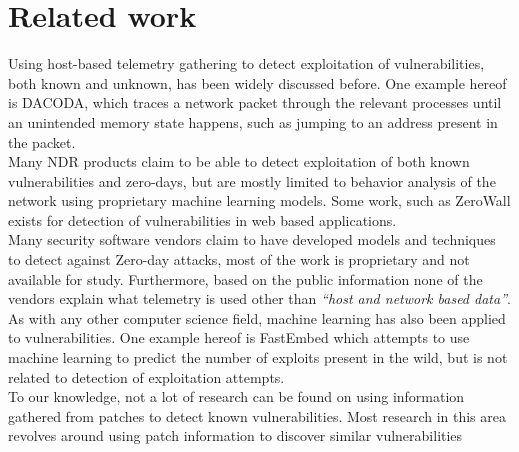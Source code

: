 \documentclass{report}
\begin{document}
\section{Related work}
Using host-based telemetry gathering to detect exploitation of vulnerabilities, both known and unknown, has been widely discussed before\cite{paper:related-work:taint-check}\cite{paper:related-work:dacoda}. One example hereof is DACODA\cite{paper:related-work:dacoda}, which traces a network packet through the relevant processes until an unintended memory state happens, such as jumping to an address present in the packet.
\\
Many \gls{NDR} products claim to be able to detect exploitation of both known vulnerabilities and zero-days\cite{url:0-day-detection:darktrace}\cite{url:0-day-detection:wehowsky}, but are mostly limited to behavior analysis of the network using proprietary machine learning models. Some work, such as ZeroWall\cite{tang2020zerowall} exists for detection of vulnerabilities in web based applications.
\\
Many security software vendors claim to have developed models and techniques to detect against Zero-day attacks\cite{url:0-day-detection:checkpoint}\cite{url:0-day-detection:capsule8}\cite{url:0-day-detection:logsign}, most of the work is proprietary and not available for study. Furthermore, based on the public information none of the vendors explain what telemetry is used other than \emph{``host and network based data''}.
\\
As with any other computer science field, machine learning has also been applied to vulnerabilities. One example hereof is FastEmbed\cite{10.1371/journal.pone.0228439} which attempts to use machine learning to predict the number of exploits present in the wild, but is not related to detection of exploitation attempts.
\\
To our knowledge, not a lot of research can be found on using information gathered from patches to detect known vulnerabilities. Most research in this area revolves around using patch information to discover similar vulnerabilities\cite{xiao2020mvp}\cite{li2016vulpecker}
\end{document}
